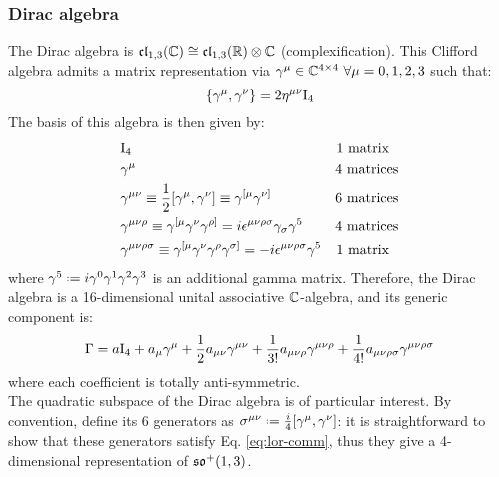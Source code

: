 \subsubsection{Dirac algebra}

The Dirac algebra is $ \mathfrak{cl}_{1,3}(\mathbb{C}) \cong \mathfrak{cl}_{1,3}(\mathbb{R}) \otimes \mathbb{C} $ (complexification). This Clifford algebra admits a matrix representation via $ \gamma^\mu \in \mathbb{C}^{4 \times 4} \,\,\forall \mu = 0,1,2,3 $ such that:
\begin{equation}
  \{\gamma^\mu , \gamma^\nu\} = 2 \eta^{\mu \nu} \mathrm{I}_4
\end{equation}
The basis of this algebra is then given by:
\begin{align*}
  & \mathrm{I}_4 & \text{1 matrix}\,\,\,\, \\
  & \gamma^\mu & \text{4 matrices} \\
  & \gamma^{\mu \nu} \equiv \frac{1}{2} [\gamma^\mu, \gamma^\nu] \equiv \gamma^{[\mu} \gamma^{\nu]} & \text{6 matrices} \\
  & \gamma^{\mu \nu \rho} \equiv \gamma^{[\mu} \gamma^\nu \gamma^{\rho]} = i \epsilon^{\mu \nu \rho \sigma} \gamma_\sigma \gamma^5 & \text{4 matrices} \\
  & \gamma^{\mu \nu \rho \sigma} \equiv \gamma^{[\mu} \gamma^\nu \gamma^\rho \gamma^{\sigma]} = - i \epsilon^{\mu \nu \rho \sigma} \gamma^5 & \text{1 matrix}\,\,\,\,
\end{align*}
where $ \gamma^5 \defeq i \gamma^0 \gamma^1 \gamma^2 \gamma^3 $ is an additional gamma matrix\footnotemark. Therefore, the Dirac algebra is a 16-dimensional unital associative $ \mathbb{C} $-algebra, and its generic component is:
\begin{equation}
  \Gamma = a \mathrm{I}_4 + a_\mu \gamma^\mu + \frac{1}{2} a_{\mu \nu} \gamma^{\mu \nu} + \frac{1}{3!} a_{\mu \nu \rho} \gamma^{\mu \nu \rho} + \frac{1}{4!} a_{\mu \nu \rho \sigma} \gamma^{\mu \nu \rho \sigma}
\end{equation}
where each coefficient is totally anti-symmetric.\\
The quadratic subspace of the Dirac algebra is of particular interest. By convention, define its 6 generators as $ \sigma^{\mu \nu} \defeq \frac{i}{4} [\gamma^\mu , \gamma^\nu] $: it is straightforward to show that these generators satisfy Eq. \ref{eq:lor-comm}, thus they give a 4-dimensional representation of $ \mathfrak{so}^+(1,3) $.


